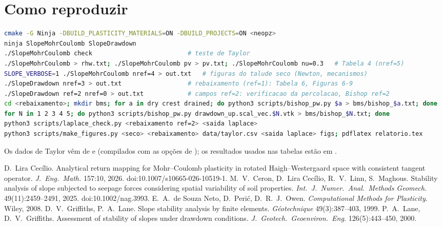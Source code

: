\documentclass[11pt,a4paper]{article}
\begin{document}
\section{Como reproduzir}
\begin{lstlisting}[language=bash]
cmake -G Ninja -DBUILD_PLASTICITY_MATERIALS=ON -DBUILD_PROJECTS=ON <neopz>
ninja SlopeMohrCoulomb SlopeDrawdown
./SlopeMohrCoulomb check                          # teste de Taylor
./SlopeMohrCoulomb > rhw.txt; ./SlopeMohrCoulomb pv > pv.txt; ./SlopeMohrCoulomb nu=0.3   # Tabela 4 (nref=5)
SLOPE_VERBOSE=1 ./SlopeMohrCoulomb nref=4 > out.txt   # figuras do talude seco (Newton, mecanismos)
./SlopeDrawdown nref=3 > out.txt                  # rebaixamento (ref=1): Tabela 6, Figuras 6-9
./SlopeDrawdown ref=2 nref=0 > out.txt            # campos ref=2: verificacao da percolacao, Bishop ref=2
cd <rebaixamento>; mkdir bms; for a in dry crest drained; do python3 scripts/bishop_pw.py $a > bms/bishop_$a.txt; done
for N in 1 2 3 4 5; do python3 scripts/bishop_pw.py drawdown_up.scal_vec.$N.vtk > bms/bishop_$N.txt; done
python3 scripts/laplace_check.py <rebaixamento ref=2> <saida laplace>
python3 scripts/make_figures.py <seco> <rebaixamento> data/taylor.csv <saida laplace> figs; pdflatex relatorio.tex
\end{lstlisting}
Os dados de Taylor vêm de  e 
(compilados com as opções de ); os resultados usados nas tabelas estão em
.


\begin{thebibliography}{9}
 D.~Lira Cecílio. Analytical return mapping for Mohr--Coulomb plasticity in rotated
  Haigh--Westergaard space with consistent tangent operator. \emph{J.\ Eng.\ Math.} 157:10, 2026.
  doi:10.1007/s10665-026-10519-1.
 M.~V.~Ceron, D.~Lira Cecílio, R.~V.~Linn, S.~Maghous. Stability analysis of slope
  subjected to seepage forces considering spatial variability of soil properties. \emph{Int.\ J.\ Numer.\
  Anal.\ Methods Geomech.} 49(11):2459--2491, 2025. doi:10.1002/nag.3993.
\bibitem{souza} E.~A.~de Souza Neto, D.~Perić, D.~R.~J.~Owen. \emph{Computational Methods for
  Plasticity}. Wiley, 2008.
 D.~V.~Griffiths, P.~A.~Lane. Slope stability analysis by finite elements.
  \emph{Géotechnique} 49(3):387--403, 1999.
 P.~A.~Lane, D.~V.~Griffiths. Assessment of stability of slopes under drawdown
  conditions. \emph{J.\ Geotech.\ Geoenviron.\ Eng.} 126(5):443--450, 2000.
\end{thebibliography}
\end{document}
